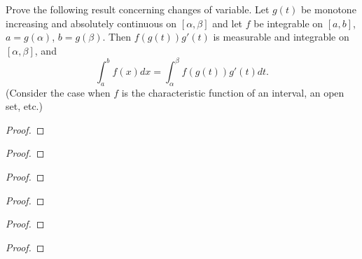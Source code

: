
\begin{problem}
Prove the following result concerning changes of variable. Let $g(t)$ be
monotone increasing and absolutely continuous on $[\alpha,\beta]$ and let $f$
be integrable on $[a,b]$, $a= g(\alpha)$, $b=
g(\beta)$. Then $f(g(t))g'(t)$ is measurable and integrable on
$[\alpha,\beta]$, and
\[
\int_a^b f(x)d x=\int_\alpha^\beta f(g(t))g'(t)d t.
\]
(Consider the case when $f$ is the characteristic function of an interval,
an open set, etc.)
\end{problem}
\begin{proof}
\end{proof}
\newpage

\begin{problem}

\end{problem}
\begin{proof}
\end{proof}
\newpage

\begin{problem}
\end{problem}
\begin{proof}
\end{proof}
\newpage

\begin{problem}
\end{problem}
\begin{proof}
\end{proof}
\newpage

\begin{problem}
\end{problem}
\begin{proof}
\end{proof}
\newpage

\begin{problem}
\end{problem}
\begin{proof}
\end{proof}

